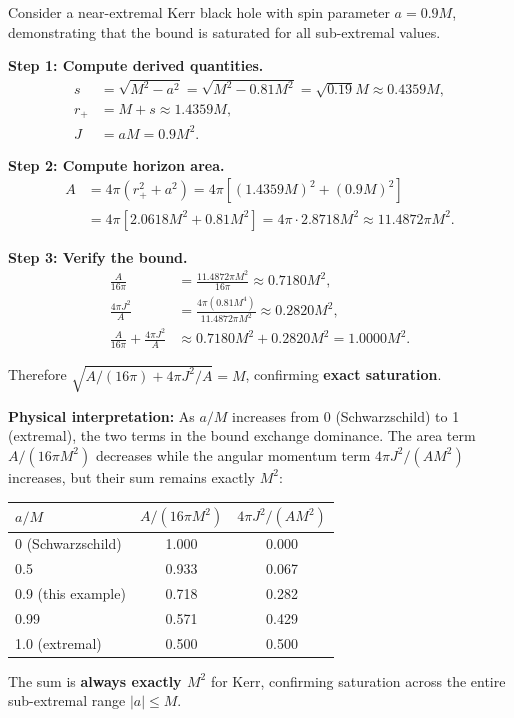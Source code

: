 \begin{example}[Worked Numerical Example: Near-Extremal Kerr with $a/M = 0.9$]\label{ex:kerr-numerical}
Consider a near-extremal Kerr black hole with spin parameter $a = 0.9M$, demonstrating that the bound is saturated for all sub-extremal values.

\textbf{Step 1: Compute derived quantities.}
\begin{align*}
    s &= \sqrt{M^2 - a^2} = \sqrt{M^2 - 0.81M^2} = \sqrt{0.19}M \approx 0.4359M, \\
    r_+ &= M + s \approx 1.4359M, \\
    J &= aM = 0.9M^2.
\end{align*}

\textbf{Step 2: Compute horizon area.}
\begin{align*}
    A &= 4\pi(r_+^2 + a^2) = 4\pi[(1.4359M)^2 + (0.9M)^2] \\
      &= 4\pi[2.0618M^2 + 0.81M^2] = 4\pi \cdot 2.8718M^2 \approx 11.4872\pi M^2.
\end{align*}

\textbf{Step 3: Verify the bound.}
\begin{align*}
    \frac{A}{16\pi} &= \frac{11.4872\pi M^2}{16\pi} \approx 0.7180M^2, \\
    \frac{4\pi J^2}{A} &= \frac{4\pi (0.81M^4)}{11.4872\pi M^2} \approx 0.2820M^2, \\
    \frac{A}{16\pi} + \frac{4\pi J^2}{A} &\approx 0.7180M^2 + 0.2820M^2 = 1.0000M^2.
\end{align*}

Therefore $\sqrt{A/(16\pi) + 4\pi J^2/A} = M$, confirming \textbf{exact saturation}.

\textbf{Physical interpretation:} As $a/M$ increases from 0 (Schwarzschild) to 1 (extremal), the two terms in the bound exchange dominance. The area term $A/(16\pi M^2)$ decreases while the angular momentum term $4\pi J^2/(AM^2)$ increases, but their sum remains exactly $M^2$:
\begin{center}
\begin{tabular}{@{}lcc@{}}
\toprule
$a/M$ & $A/(16\pi M^2)$ & $4\pi J^2/(AM^2)$ \\
\midrule
0 (Schwarzschild) & 1.000 & 0.000 \\
0.5 & 0.933 & 0.067 \\
0.9 (this example) & 0.718 & 0.282 \\
0.99 & 0.571 & 0.429 \\
1.0 (extremal) & 0.500 & 0.500 \\
\bottomrule
\end{tabular}
\end{center}
The sum is \textbf{always exactly $M^2$} for Kerr, confirming saturation across the entire sub-extremal range $|a| \leq M$.
\end{example}

